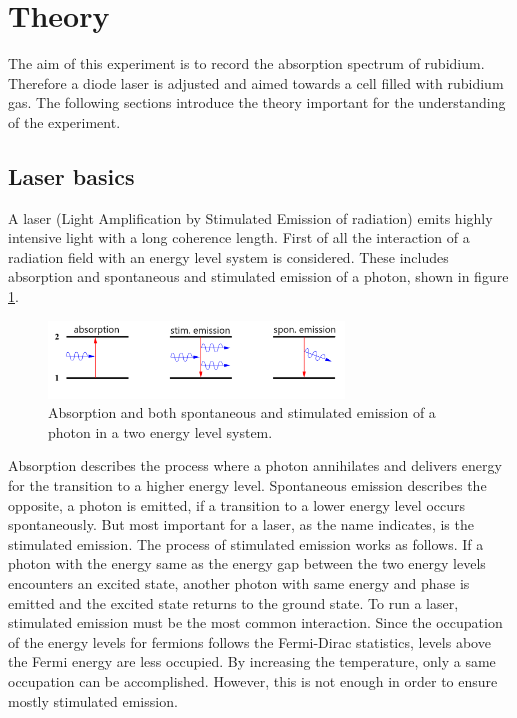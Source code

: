 \section{Theory}
\label{sec:theory}
The aim of this experiment is to record the absorption spectrum
of rubidium. Therefore a diode laser is adjusted and aimed towards a cell
filled with rubidium gas.
The following sections introduce the theory
important for the understanding of the experiment.

\subsection{Laser basics}
\label{subsec:laser}
A laser (Light Amplification by Stimulated Emission of radiation)
emits highly intensive light with a long coherence length.
First of all the interaction of a radiation field with
an energy level system is considered. These includes
absorption and spontaneous and stimulated emission
of a photon, shown in figure \ref{fig:ab_em}.
\begin{figure}
\centering
\includegraphics[width=0.7\textwidth]{ab_und_emiss.png}
\caption{Absorption and both spontaneous and stimulated emission of a photon in a two energy level system.
\cite{V61}}
\label{fig:ab_em}
\end{figure}
Absorption describes the process where a photon annihilates and
delivers energy for the transition
to a higher energy level.
Spontaneous emission describes the opposite, a photon is
emitted, if a transition to a lower energy
level occurs spontaneously.
But most important for a laser, as the name indicates,
is the stimulated emission.
The process of stimulated emission works as follows.
If a photon with the energy same as
the energy gap between the two energy levels
encounters an excited state, another photon with
same energy and phase is emitted and the excited state
returns to the ground state.
To run a laser, stimulated emission must be the most common interaction.
Since the occupation of the energy levels for fermions follows
the Fermi-Dirac statistics, %
levels above the Fermi energy are
less occupied. By increasing the temperature, only
a same occupation can be accomplished.
However, this is not enough in order to ensure mostly stimulated emission.
